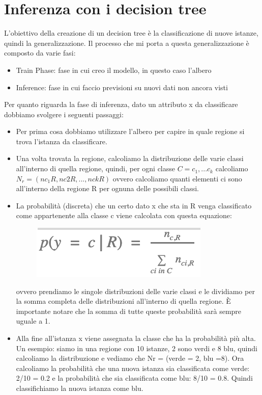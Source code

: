 \documentclass[14pt]{extreport}
\begin{document}
				\section{Inferenza con i decision tree}

				L’obiettivo della creazione di un decision tree è la classificazione di nuove istanze, quindi la generalizzazione.
Il processo che mi porta a questa generalizzazione è composto da varie fasi:
\begin{itemize}
	\item Train Phase: fase in cui creo il modello, in questo caso l’albero
	\item Inference: fase in cui faccio previsioni su nuovi dati non ancora visti
	\end{itemize}

	Per quanto riguarda la fase di inferenza, dato un attributo x da classificare dobbiamo svolgere i seguenti passaggi:
	\begin{itemize}
		\item Per prima cosa dobbiamo utilizzare l’albero per capire in quale regione si trova l’istanza da classificare.
		\item Una volta trovata la regione, calcoliamo la distribuzione delle varie classi all’interno di quella regione, quindi, per ogni classe 
		$C = c_1,...c_k$  calcoliamo $N_r = (nc_1R, nc2R,..., nckR)$ ovvero calcoliamo quanti elementi ci sono all’interno della regione R per ognuna delle possibili classi.

		\item La probabilità (discreta) che un certo dato x che sta in R venga classificato come appartenente alla classe c viene calcolata con questa equazione:
			
\begin{figure}[H] 
	\centering
	\includegraphics[width=0.7\linewidth]{480.jpeg}
	\end{figure}
	ovvero prendiamo le singole distribuzioni delle varie classi e le dividiamo per la somma completa delle distribuzioni all’interno di quella regione.
	È importante notare che la somma di tutte queste probabilità sarà sempre uguale a 1.

		\item Alla fine all’istanza x viene assegnata la classe che ha la probabilità più alta.
		Un esempio: siamo in una regione con 10 istanze, 2 sono verdi e 8 blu, quindi calcoliamo la distribuzione e vediamo che Nr = (verde = 2, blu =8).
		Ora calcoliamo la probabilità che una nuova istanza sia classificata come verde: 2/10 = 0.2 e la probabilità che sia classificata come blu: 8/10 = 0.8.
		Quindi classifichiamo la nuova istanza come blu.
		
		\end{itemize} 
\end{document}
